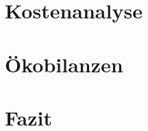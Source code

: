 \documentclass[12pt]{article}
\begin{document}
\section{Kostenanalyse}


\section{Ökobilanzen}


\section{Fazit}

\nocite{viebahn2011}
\nocite{iea2010}
\nocite{irena2012}
\nocite{trieb2009}
\nocite{stegen2012}
\nocite{estela2010}
\nocite{muhlenhoff2010}

\newpage

\end{document}
